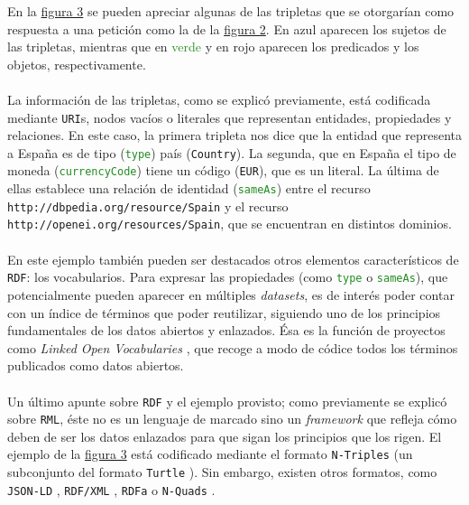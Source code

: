             En la \hyperref[fig:triplets]{figura 3} se pueden apreciar algunas de las tripletas que se otorgarían como respuesta a una petición como la de la \hyperref[fig:linked]{figura 2}. En \textcolor{Cerulean}{azul} aparecen los sujetos de las tripletas, mientras que en \textcolor{ForestGreen}{verde} y en \textcolor{BrickRed}{rojo} aparecen los predicados y los objetos, respectivamente.
            \\ \\
            La información de las tripletas, como se explicó previamente, está codificada mediante \texttt{URI}s, nodos vacíos o literales que representan entidades, propiedades y relaciones. En este caso, la primera tripleta nos dice que la entidad que representa a España es de tipo (\textcolor{ForestGreen}{\texttt{type}}) país (\textcolor{BrickRed}{\texttt{Country}}). La segunda, que en España el tipo de moneda (\textcolor{ForestGreen}{\texttt{currencyCode}}) tiene un código (\textcolor{BrickRed}{\texttt{EUR}}), que es un literal. La última de ellas establece una relación de identidad (\textcolor{ForestGreen}{\texttt{sameAs}}) entre el recurso \textcolor{Cerulean}{\texttt{http://dbpedia.org/resource/Spain}} y el recurso \textcolor{BrickRed}{\texttt{http://openei.org/resources/Spain}}, que se encuentran en distintos dominios.
            \\ \\
            En este ejemplo también pueden ser destacados otros elementos característicos de \texttt{RDF}: los vocabularios. Para expresar las propiedades (como \textcolor{ForestGreen}{\texttt{type}} o \textcolor{ForestGreen}{\texttt{sameAs}}), que potencialmente pueden aparecer en múltiples \textit{datasets}, es de interés poder contar con un índice de términos que poder reutilizar, siguiendo uno de los principios fundamentales de los datos abiertos y enlazados. Ésa es la función de proyectos como \textit{Linked Open Vocabularies} \cite{LOV}, que recoge a modo de códice todos los términos publicados como datos abiertos.
            \\ \\
            Un último apunte sobre \texttt{RDF} y el ejemplo provisto; como previamente se explicó sobre \texttt{RML}, éste no es un lenguaje de marcado sino un \textit{framework} que refleja cómo deben de ser los datos enlazados para que sigan los principios que los rigen. El ejemplo de la \hyperref[fig:linked]{figura 3} está codificado mediante el formato \texttt{N-Triples} \cite{NTRIPLES} (un subconjunto del formato \texttt{Turtle} \cite{TURTLE}). Sin embargo, existen otros formatos, como \texttt{JSON-LD} \cite{JSONLD}, \texttt{RDF/XML} \cite{RDFXML}, \texttt{RDFa} \cite{RDFA} o \texttt{N-Quads} \cite{NQUADS}.
        
